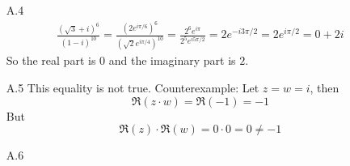 \documentclass[../../Solutions.tex]{subfiles}
\begin{document}
\begin{itemize}
	\item [A.4] 
		\begin{equation*} \begin{split}
			\frac{(\sqrt{3}+i)^6}{(1-i)^{10}} = \frac{(2e^{i\pi/6})^6}{(\sqrt{2}e^{i\pi/4})^{10}}
				 = \frac{2^6e^{i\pi}}{2^5e^{i5\pi/2}} = 2e^{-i3\pi/2} = 2e^{i\pi/2} = 0+2i
		\end{split} \end{equation*}
		So the real part is $0$ and the imaginary part is $2$.
		
	\item [A.5] This equality is not true.
	Counterexample: Let $z = w = i$, then
	$$ \Re(z \cdot w) = \Re(-1) = -1 $$
	But
	$$ \Re(z) \cdot \Re(w) = 0 \cdot 0 = 0 \neq -1 $$
	
	\item [A.6]
\end{itemize}
\end{document}
